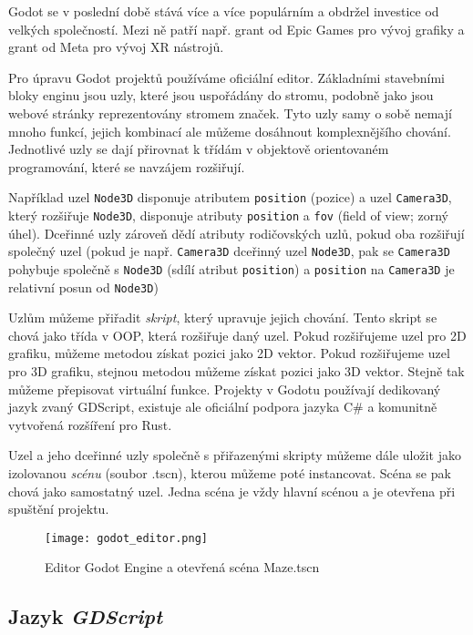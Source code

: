 Godot se v poslední době stává více a více populárním a obdržel investice od velkých společností. Mezi ně patří např. grant od Epic Games pro vývoj grafiky a grant od Meta pro vývoj XR nástrojů. \cite{godot_epicgames} \cite{godot_meta}

Pro úpravu Godot projektů používáme oficiální editor. Základními stavebními bloky enginu jsou uzly, které jsou uspořádány do stromu, podobně jako jsou webové stránky reprezentovány stromem značek. Tyto uzly samy o sobě nemají mnoho funkcí, jejich kombinací ale můžeme dosáhnout komplexnějšího chování. Jednotlivé uzly se dají přirovnat k třídám v objektově orientovaném programování, které se navzájem rozšiřují.

Například uzel \texttt{Node3D} disponuje atributem \texttt{position} (pozice) a uzel \texttt{Camera3D}, který rozšiřuje \texttt{Node3D}, disponuje atributy \texttt{position} a \texttt{fov} (field of view; zorný úhel). Dceřinné uzly zároveň dědí atributy rodičovských uzlů, pokud oba rozšiřují společný uzel (pokud je např. \texttt{Camera3D} dceřinný uzel \texttt{Node3D}, pak se \texttt{Camera3D} pohybuje společně s \texttt{Node3D} (sdílí atribut \texttt{position}) a \texttt{position} na \texttt{Camera3D} je relativní posun od \texttt{Node3D})

Uzlům můžeme přiřadit \textit{skript}, který upravuje jejich chování. Tento skript se chová jako třída v OOP, která rozšiřuje daný uzel. Pokud rozšiřujeme uzel pro 2D grafiku, můžeme metodou získat pozici jako 2D vektor. Pokud rozšiřujeme uzel pro 3D grafiku, stejnou metodou můžeme získat pozici jako 3D vektor. Stejně tak můžeme přepisovat virtuální funkce. Projekty v Godotu používají dedikovaný jazyk zvaný GDScript, existuje ale oficiální podpora jazyka C\# a komunitně vytvořená rozšíření pro Rust.

Uzel a jeho dceřinné uzly společně s přiřazenými skripty můžeme dále uložit jako izolovanou \textit{scénu} (soubor .tscn), kterou můžeme poté instancovat. Scéna se pak chová jako samostatný uzel. Jedna scéna je vždy hlavní scénou a je otevřena při spuštění projektu.

\begin{figure}[H]
  \centering
  \texttt{[image: godot\_editor.png]}
  \caption{Editor Godot Engine a otevřená scéna Maze.tscn}
  \label{godot_editor_maze_tscn}
\end{figure}

\subsection{Jazyk \textit{GDScript}}

